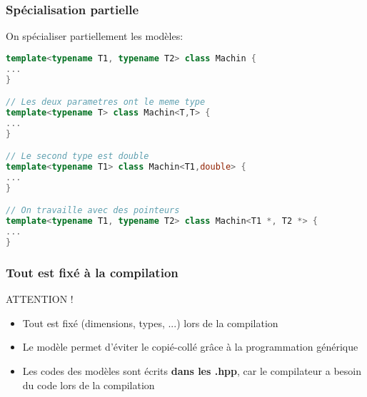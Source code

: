 \documentclass{beamer}
\begin{document}
\begin{frame}[fragile=singleslide,shrink=20]
\frametitle {Spécialisation partielle}

On spécialiser partiellement les modèles:

\begin{lstlisting}[language=c++]
template<typename T1, typename T2> class Machin {
...
}

// Les deux parametres ont le meme type
template<typename T> class Machin<T,T> {
...
}

// Le second type est double
template<typename T1> class Machin<T1,double> {
...
}

// On travaille avec des pointeurs
template<typename T1, typename T2> class Machin<T1 *, T2 *> {
...
}
\end{lstlisting}

\end{frame}

\begin{frame}
\frametitle {Tout est fixé à la compilation}

\begin{block}{ATTENTION !}
\begin{itemize}
\item{Tout est fixé (dimensions, types, ...) lors de la compilation}
\item{Le modèle permet d'éviter le copié-collé grâce à la programmation générique}
\item{Les codes des modèles sont écrits \textbf{dans les .hpp}, car le compilateur a besoin du code lors de la compilation}
\end{itemize}
\end{block}

\end{frame}
\end{document}
